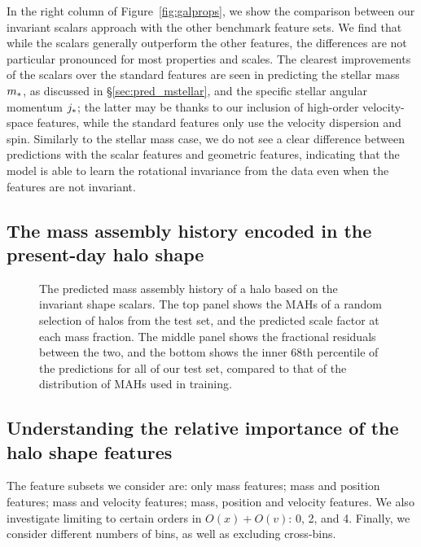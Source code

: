 In the right column of Figure~\ref{fig:galprops}, we show the comparison between our invariant scalars approach with the other benchmark feature sets.
We find that while the scalars generally outperform the other features, the differences are not particular pronounced for most properties and scales.
The clearest improvements of the scalars over the standard features are seen in predicting the stellar mass $m_*$, as discussed in \S\ref{sec:pred_mstellar}, and the specific stellar angular momentum $j_*$; the latter may be thanks to our inclusion of high-order velocity-space features, while the standard features only use the velocity dispersion and spin.
Similarly to the stellar mass case, we do not see a clear difference between predictions with the scalar features and geometric features, indicating that the model is able to learn the rotational invariance from the data even when the features are not invariant.


\subsection{The mass assembly history encoded in the present-day halo shape}


\begin{figure}
    \centering
    \caption{The predicted mass assembly history of a halo based on the invariant shape scalars. The top panel shows the MAHs of a random selection of halos from the test set, and the predicted scale factor at each mass fraction. The middle panel shows the fractional residuals between the two, and the bottom shows the inner 68th percentile of the predictions for all of our test set, compared to that of the distribution of MAHs used in training. }
    \label{fig:mah}
\end{figure}


\subsection{Understanding the relative importance of the halo shape features}

The feature subsets we consider are: only mass features; mass and position features; mass and velocity features; mass, position and velocity features.
We also investigate limiting to certain orders in $O(x)+O(v)$: 0, 2, and 4.
Finally, we consider different numbers of bins, as well as excluding cross-bins.

